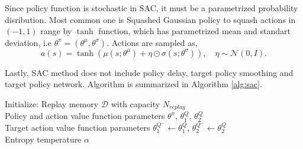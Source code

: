 Since policy function is stochastic in SAC, it must be a parametrized probability disribution. Most common one is 
Squashed Gaussian policy to squash actions in $(-1,1)$ range by $\tanh$ function, which has parametrized mean and standart deviation, i.e $\theta^{\pi}=(\theta^{\mu}, \theta^{\sigma})$. Actions are sampled as,
\begin{equation}
\label{eqn:squashed_gp_sampling}
a(s) = \tanh(\mu(s; \theta^{\mu}) + \eta \odot \sigma(s; \theta^{\sigma})), \quad \eta \sim \mathcal{N}(0, I). 
\end{equation}

Lastly, SAC method does not include policy delay, target policy smoothing and target policy network. 
Algorithm is summarized in Algorithm \ref{alg:sac}.
\begin{algorithm}
	\SetAlgoLined
	\DontPrintSemicolon %
	Initialize: Replay memory $\mathcal{D}$ with capacity $N_{replay}$ \\
	Policy and action value function parameters $\theta^{\pi}$, $\theta^Q_1$, $\theta^Q_2$  \\
	Target action value function parameters $\theta^{Q^-}_1 \leftarrow \theta^{Q}_1$, $\theta^{Q^-}_2 \leftarrow \theta^{Q}_2$ \\
	Entropy temperature $\alpha$ \\
\end{algorithm}

